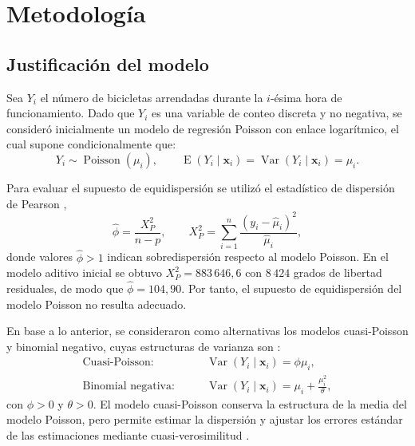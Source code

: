 \documentclass[12pt, a4paper]{article}
\numberwithin{equation}{section}
\begin{document}
\FloatBarrier
\section{Metodología}

\subsection{Justificación del modelo}
Sea $Y_i$ el número de bicicletas arrendadas durante la $i$-ésima hora de funcionamiento. Dado que $Y_i$ es una variable de conteo discreta y no negativa, se consideró inicialmente un modelo de regresión Poisson con enlace logarítmico, el cual supone condicionalmente que:
\[
Y_i\sim\operatorname{Poisson}(\mu_i),\qquad
\operatorname{E}(Y_i\mid\mathbf{x}_i)=\operatorname{Var}(Y_i\mid\mathbf{x}_i)=\mu_i.
\]

Para evaluar el supuesto de equidispersión se utilizó el estadístico de dispersión de Pearson \cite{mccullagh},
\[
\widehat{\phi}=\frac{X_P^2}{n-p},\qquad
X_P^2=\sum_{i=1}^n\frac{(y_i-\widehat{\mu}_i)^2}{\widehat{\mu}_i},
\]
donde valores $\widehat{\phi}>1$ indican sobredispersión respecto al modelo Poisson. En el modelo aditivo inicial se obtuvo $X_P^2 = 883\,646{,}6$ con $8\,424$ grados de libertad residuales, de modo que $\widehat{\phi}=104{,}90$. Por tanto, el supuesto de equidispersión del modelo Poisson no resulta adecuado.

En base a lo anterior, se consideraron como alternativas los modelos cuasi-Poisson y binomial negativo, cuyas estructuras de varianza son \cite{verhoef}:
\begin{align*}
\text{Cuasi-Poisson:}\qquad &\operatorname{Var}(Y_i\mid\mathbf{x}_i)=\phi\mu_i,\\
\text{Binomial negativa:}\qquad &\operatorname{Var}(Y_i\mid\mathbf{x}_i)=\mu_i+\frac{\mu_i^2}{\theta},
\end{align*}
con $\phi>0$ y $\theta>0$. El modelo cuasi-Poisson conserva la estructura de la media del modelo Poisson, pero permite estimar la dispersión y ajustar los errores estándar de las estimaciones mediante cuasi-verosimilitud \cite{mccullagh}.

\newpage
\end{document}

